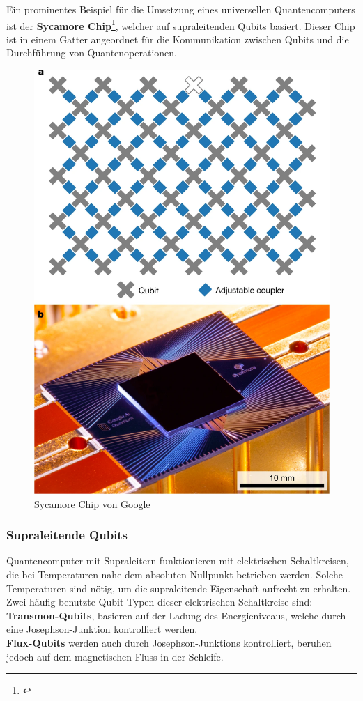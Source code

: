Ein prominentes Beispiel für die Umsetzung eines universellen Quantencomputers ist der \textbf{Sycamore Chip}\footnote{\cite{arute_quantum_2019}}, welcher auf supraleitenden Qubits basiert.
Dieser Chip ist in einem Gatter angeordnet für die Kommunikation zwischen Qubits und die Durchführung von Quantenoperationen.\\

\begin{figure}[H]
    \centering
    \includegraphics[width=0.7\linewidth]{img/SycamoreChip.png}
    \caption{Sycamore Chip von Google \cite{arute_quantum_2019}}
    \label{fig:Sycamore}
\end{figure}

\subsubsection{Supraleitende Qubits}
\label{subsub:superleiter}
Quantencomputer mit Supraleitern funktionieren mit elektrischen Schaltkreisen, die bei Temperaturen nahe dem absoluten Nullpunkt betrieben werden. Solche Temperaturen sind nötig,
um die supraleitende Eigenschaft aufrecht zu erhalten.\\

Zwei häufig benutzte Qubit-Typen dieser elektrischen Schaltkreise sind:\\
\textbf{Transmon-Qubits}, basieren auf der Ladung des Energieniveaus, welche durch eine Josephson-Junktion kontrolliert werden.\\
\textbf{Flux-Qubits} werden auch durch Josephson-Junktions kontrolliert, beruhen jedoch auf dem magnetischen Fluss in der Schleife.\\

